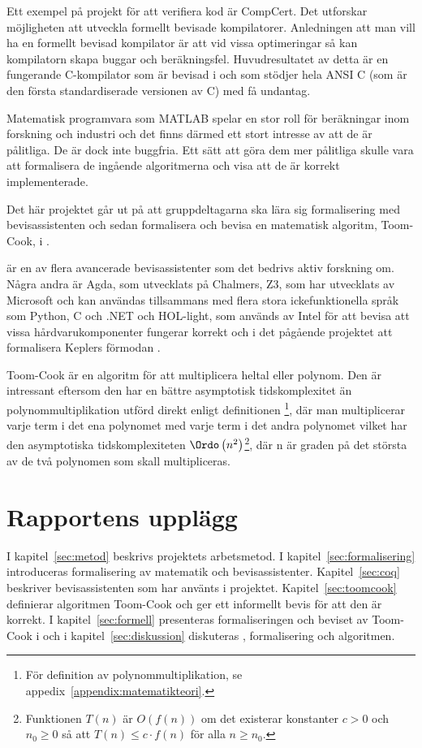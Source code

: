 Ett exempel på projekt för att verifiera kod är CompCert. Det utforskar
möjligheten att utveckla formellt bevisade kompilatorer. Anledningen att man
vill ha en formellt bevisad kompilator är att vid vissa optimeringar så kan
kompilatorn skapa buggar och beräkningsfel. Huvudresultatet av detta är en
fungerande C-kompilator som är bevisad i \coq{} och som stödjer hela ANSI C (som
är den första standardiserade versionen av C) med få
undantag\autocite{compcert}.

Matematisk programvara som MATLAB spelar en stor roll för beräkningar inom
forskning och industri och det finns därmed ett stort intresse av att de är
pålitliga. De är dock inte buggfria. Ett sätt att göra dem mer pålitliga skulle
vara att formalisera de ingående algoritmerna och visa att de är korrekt
implementerade\cite{denes2012refinement}.

Det här projektet går ut på att gruppdeltagarna ska lära sig formalisering med
bevisassistenten \coq{} och sedan formalisera och bevisa en matematisk algoritm,
Toom-Cook, i \coq{}.

\coq{} är en av flera avancerade bevisassistenter som det bedrivs aktiv forskning
om. Några andra är Agda, som utvecklats på Chalmers, Z3, som har utvecklats av
Microsoft och kan användas tillsammans med flera stora ickefunktionella språk
som Python, C och .NET och HOL-light, som används av Intel för att bevisa att
vissa hårdvarukomponenter fungerar korrekt och i det pågående projektet att
formalisera Keplers förmodan \cite{hales2008formal}.

Toom-Cook är en algoritm för att multiplicera heltal eller polynom. Den är
intressant eftersom den har en bättre asymptotisk tidskomplexitet än
polynommultiplikation utförd direkt enligt definitionen \footnote{För
definition av polynommultiplikation, se
appedix~\ref{appendix:matematikteori}.}, där man multiplicerar varje term i det
ena polynomet med varje term i det andra polynomet vilket har den asymptotiska
tidskomplexiteten $\Ordo\left(n^2\right)$\footnote{Funktionen $T(n)$ är $O(f(n))$
om det existerar konstanter $c > 0$ och $n_0 \geq 0$ så att $T(n) \leq c \cdot
f(n)$ för alla $n \geq n_0$.}, där n är graden på det största av de två
polynomen som skall multipliceras.

\section{Rapportens upplägg}
I kapitel~\ref{sec:metod} beskrivs projektets arbetsmetod. I
kapitel~\ref{sec:formalisering} introduceras formalisering av matematik och
bevisassistenter. Kapitel~\ref{sec:coq} beskriver bevisassistenten \coq{} som har
använts i projektet. Kapitel~\ref{sec:toomcook} definierar algoritmen Toom-Cook och
ger ett informellt bevis för att den är korrekt. I kapitel~\ref{sec:formell}
presenteras formaliseringen och beviset av Toom-Cook i \coq{} och i
kapitel~\ref{sec:diskussion} diskuteras \coq{}, formalisering och algoritmen.

